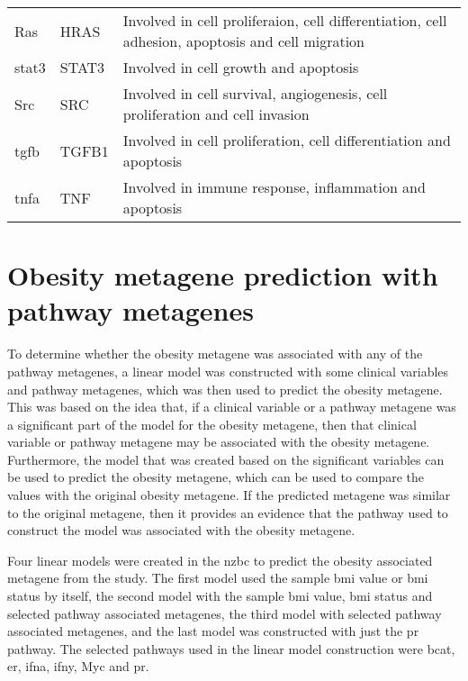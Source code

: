 \begin{longtable}{llp{8cm}}
	\rule{0pt}{2.25ex}Ras         & HRAS   & Involved in cell proliferaion, cell differentiation, cell adhesion, apoptosis and cell migration\\
	\rule{0pt}{2.25ex}\Gls{stat3} & STAT3  & Involved in cell growth and apoptosis\\
	\rule{0pt}{2.25ex}Src         & SRC    & Involved in cell survival, angiogenesis, cell proliferation and cell invasion\\
	\rule{0pt}{2.25ex}\Gls{tgfb}  & TGFB1  & Involved in cell proliferation, cell differentiation and apoptosis\\
	\rule{0pt}{2.25ex}\Gls{tnfa}  & TNF    & Involved in immune response, inflammation and apoptosis\\
\end{longtable}

\section{Obesity metagene prediction with pathway metagenes}
\label{sec:obesity_metagene_prediction_with_pathway_metagenes}

To determine whether the obesity metagene was associated with any of the pathway metagenes, a linear model was constructed with some clinical variables and pathway metagenes, which was then used to predict the obesity metagene.
This was based on the idea that, if a clinical variable or a pathway metagene was a significant part of the model for the obesity metagene, then that clinical variable or pathway metagene may be associated with the obesity metagene.
Furthermore, the model that was created based on the significant variables can be used to predict the obesity metagene, which can be used to compare the values with the original obesity metagene.
If the predicted metagene was similar to the original metagene, then it provides an evidence that the pathway used to construct the model was associated with the obesity metagene.

Four linear models were created in the \gls{nzbc} to predict the obesity associated metagene from the \citet{Creighton2012} study.
The first model used the sample \gls{bmi} value or \gls{bmi} status by itself, the second model with the sample \gls{bmi} value, \gls{bmi} status and selected pathway associated metagenes, the third model with selected pathway associated metagenes, and the last model was constructed with just the \gls{pr} pathway.
The selected pathways used in the linear model construction were \gls{bcat}, \gls{er}, \gls{ifna}, \gls{ifny}, Myc and \gls{pr}.

